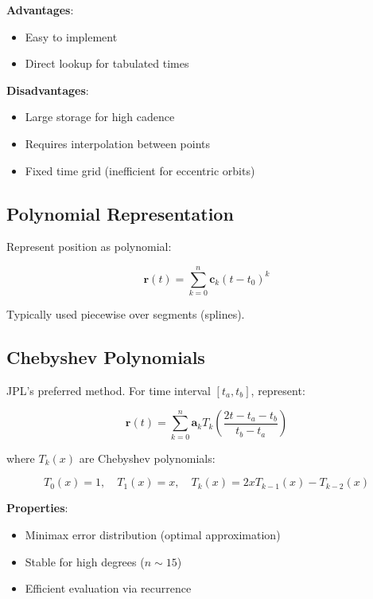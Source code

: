 \textbf{Advantages}:
\begin{itemize}
    \item Easy to implement
    \item Direct lookup for tabulated times
\end{itemize}

\textbf{Disadvantages}:
\begin{itemize}
    \item Large storage for high cadence
    \item Requires interpolation between points
    \item Fixed time grid (inefficient for eccentric orbits)
\end{itemize}

\subsection{Polynomial Representation}

Represent position as polynomial:

\begin{equation}
    \mathbf{r}(t) = \sum_{k=0}^{n} \mathbf{c}_k (t - t_0)^k
\end{equation}

Typically used piecewise over segments (splines).

\subsection{Chebyshev Polynomials}

JPL's preferred method. For time interval $[t_a, t_b]$, represent:

\begin{equation}
    \mathbf{r}(t) = \sum_{k=0}^{n} \mathbf{a}_k T_k\left(\frac{2t - t_a - t_b}{t_b - t_a}\right)
\end{equation}

where $T_k(x)$ are Chebyshev polynomials:

\begin{equation}
    T_0(x) = 1, \quad T_1(x) = x, \quad T_k(x) = 2xT_{k-1}(x) - T_{k-2}(x)
\end{equation}

\textbf{Properties}:
\begin{itemize}
    \item Minimax error distribution (optimal approximation)
    \item Stable for high degrees ($n \sim 15$)
    \item Efficient evaluation via recurrence
\end{itemize}

